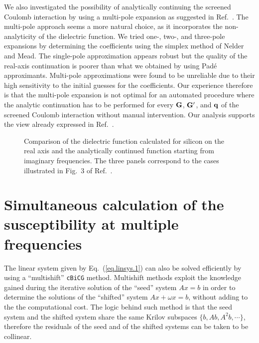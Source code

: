 \documentclass[twocolumn,prb,showpacs,superscriptaddress]{revtex4}
\def\w{\omega}
\def\q{{\bf q}}
\def\G{{\bf G}}
\def\Gp{{\bf G^\prime}}
\begin{document}
We also investigated the possibility of analytically continuing
the screened Coulomb interaction by using a multi-pole expansion
as suggested in Ref.\ . The multi-pole approach
seems a more natural choice, as it incorporates the non-analyticity
of the dielectric function. We tried one-, two-, and three-pole
expansions by determining the coefficients using the simplex 
method of Nelder and Mead.\cite{nelder-mead}
The single-pole approximation appears robust but the quality
of the real-axis continuation is poorer than what we obtained
by using Pad\'e approximants. Multi-pole approximations were found
to be unreliable due to their high sensitivity to the initial guesses 
for the coefficients.
Our experience therefore is that the multi-pole expansion is not optimal 
for an automated procedure where the analytic continuation has to be
performed for every $\G$, $\Gp$, and $\q$ of the screened Coulomb 
interaction without manual intervention. Our analysis supports the view 
already expressed in Ref.\ .

\begin  {figure}
\begin  {center}
\end    {center}
\caption{\label{fig.pade}
        Comparison of the dielectric function calculated for silicon 
        on the real axis and the analytically continued function starting
        from imaginary frequencies. The three panels correspond to the
        cases illustrated in Fig.\ 3 of Ref.\ .
        }
\end    {figure}

\section{Simultaneous calculation of the susceptibility at multiple frequencies}\label{app.multishift}

The linear system given by Eq.\ (\ref{eq.linsys.1}) 
can also be solved efficiently by using a ``multishift'' 
{\tt cBiCG} method.\cite{frommer} 
Multishift methods exploit the knowledge gained during the iterative
solution of the ``seed'' system $Ax=b$ in order to determine the solutions 
of the ``shifted'' system $Ax+\w x=b$, without adding to the the computational 
cost. The logic behind such method is that the seed system and the
shifted system share the same Krilov subspaces $\{b,Ab,A^2b,\cdots\}$,
therefore the residuals of the seed and of the shifted
systems can be taken to be collinear.\cite{frommer}
\end{document}
